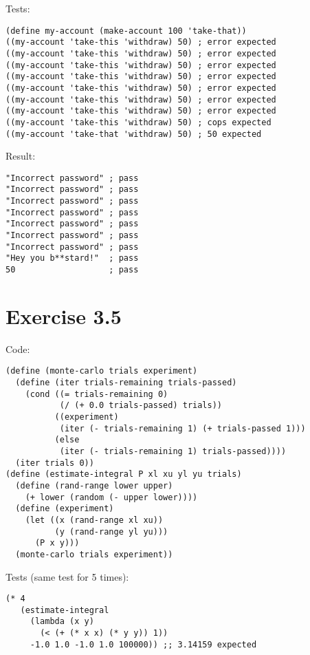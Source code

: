 \documentclass[../main.tex]{subfiles}
\begin{document}
Tests:

\begin{lstlisting}
(define my-account (make-account 100 'take-that))
((my-account 'take-this 'withdraw) 50) ; error expected
((my-account 'take-this 'withdraw) 50) ; error expected
((my-account 'take-this 'withdraw) 50) ; error expected
((my-account 'take-this 'withdraw) 50) ; error expected
((my-account 'take-this 'withdraw) 50) ; error expected
((my-account 'take-this 'withdraw) 50) ; error expected
((my-account 'take-this 'withdraw) 50) ; error expected
((my-account 'take-this 'withdraw) 50) ; cops expected
((my-account 'take-that 'withdraw) 50) ; 50 expected
\end{lstlisting}

Result:

\begin{lstlisting}
"Incorrect password" ; pass
"Incorrect password" ; pass
"Incorrect password" ; pass
"Incorrect password" ; pass
"Incorrect password" ; pass
"Incorrect password" ; pass
"Incorrect password" ; pass
"Hey you b**stard!"  ; pass
50                   ; pass
\end{lstlisting}

\section{Exercise 3.5}

Code:

\begin{lstlisting}
(define (monte-carlo trials experiment)
  (define (iter trials-remaining trials-passed)
    (cond ((= trials-remaining 0)
           (/ (+ 0.0 trials-passed) trials))
          ((experiment)
           (iter (- trials-remaining 1) (+ trials-passed 1)))
          (else
           (iter (- trials-remaining 1) trials-passed))))
  (iter trials 0))
(define (estimate-integral P xl xu yl yu trials)
  (define (rand-range lower upper)
    (+ lower (random (- upper lower))))
  (define (experiment)
    (let ((x (rand-range xl xu))
          (y (rand-range yl yu)))
      (P x y)))
  (monte-carlo trials experiment))
\end{lstlisting}

Tests (same test for 5 times):

\begin{lstlisting}
(* 4
   (estimate-integral
     (lambda (x y)
       (< (+ (* x x) (* y y)) 1))
     -1.0 1.0 -1.0 1.0 100000)) ;; 3.14159 expected
\end{lstlisting}
\end{document}
